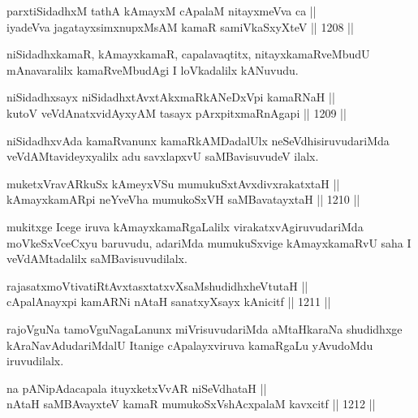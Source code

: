 \begin{shl}
parxtiSidadhxM tathA kAmayxM cApalaM nitayxmeVva ca || \\
iyadeVva jagatayxsimxnupxMsAM kamaR samiVkaSxyXteV \hfill || 1208 ||  
\end{shl}

\begin{artha}
niSidadhxkamaR, kAmayxkamaR, capalavaqtitx, nitayxkamaRveMbudU mAnavaralilx kamaRveMbudAgi I loVkadalilx kANuvudu.
\end{artha}

\begin{shl}
niSidadhxsayx niSidadhxtAvxtAkxmaRkANeDxV\s pi kamaRNaH || \\
kutoV veVdAnatxvidAyxyAM tasayx pArxpitxmaRnAgapi \hfill || 1209 ||  
\end{shl}

\begin{artha}
niSidadhxvAda kamaRvanunx kamaRkAMDadalUlx neSeVdhisiruvudariMda veVdAMtavideyxyalilx adu savxlapxvU saMBavisuvudeV ilalx.
\end{artha}

\begin{shl}
muketxVravARkuSx kAmeyxVSu mumukuSxtAvxdivxrakatxtaH || \\
kAmayxkamARpi neYveVha mumukoSxVH saMBavatayxtaH \hfill || 1210 ||  
\end{shl}

\begin{artha}
mukitxge Icege iruva kAmayxkamaRgaLalilx virakatxvAgiruvudariMda moVkeSxVceCxyu baruvudu, adariMda mumukuSxvige kAmayxkamaRvU saha I veVdAMtadalilx saMBavisuvudilalx.
\end{artha}

\begin{shl}
rajasatxmoVtivatiRtAvxtasxtatxvXsaMshudidhxheVtutaH || \\
cApalAnayxpi kamARNi nAtaH sanatxyXsayx kAnicitf \hfill || 1211 ||  
\end{shl}

\begin{artha}
rajoVguNa tamoVguNagaLanunx miVrisuvudariMda aMtaHkaraNa shudidhxge kAraNavAdudariMdalU Itanige cApalayxviruva kamaRgaLu yAvudoMdu iruvudilalx.
\end{artha}

\begin{shl}
\footnotemark[1]na pANipAdacapala ituyxketxVvAR niSeVdhataH || \\
nAtaH saMBAvayxteV kamaR mumukoSxVshAcxpalaM kavxcitf \hfill || 1212 ||  
\end{shl}

